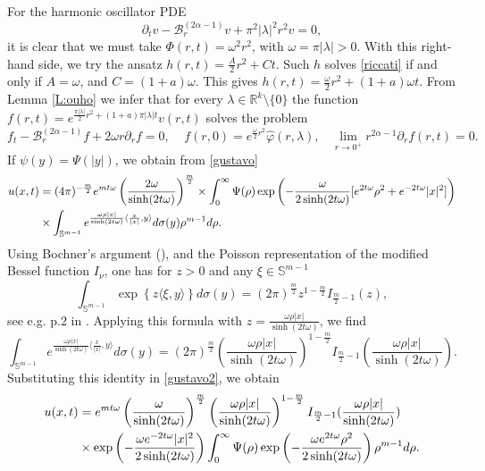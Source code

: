 \documentclass[11pt,a4paper]{amsart}
\def \R {\mathbb{R}}
\newcommand{\Barr}{\mathscr B_r^{(2\alpha-1)}}
\def \vf{\varphi}
\newcommand{\p}{\partial}
\newcommand{\la}{\lambda}
\numberwithin{equation}{section}
\newcommand{\sa}{\langle}
\newcommand{\da}{\rangle}
\numberwithin{equation}{section}
\begin{document}
For the harmonic oscillator PDE
\[
\p_t v - \Barr v + \pi^2|\la|^2 r^2 v = 0,
\]
it is clear that we must take $\Phi(r,t) =  \omega^2 r^2$, with $\omega = \pi |\la|>0$. With this right-hand side,  we try the ansatz $h(r,t) = \frac{A}{2} r^2 + C t$. Such $h$ solves \eqref{riccati} if and only if
$A = \omega$, and  $C = (1+a)\omega$. This gives $h(r,t) = \frac{\omega}{2} r^2 + (1+a)\omega t$. From Lemma \ref{L:ouho} we infer that for every $\la\in \R^k\setminus\{0\}$ the function $f(r,t) = e^{\frac{\pi |\la|}{2} r^2 + (1+a)\pi |\la| t} v(r,t)$ solves the problem
\begin{equation}\label{cpou}
f_t - \Barr f + 2 \omega r \p_r  f  = 0,\ \ \ \ \ f(r,0) = e^{\frac{\omega}{2} r^2} \hat \vf(r,\la),\ \ \ \ \underset{r\to 0^+}{\lim} r^{2\alpha-1} \p_r f(r,t) = 0.
\end{equation}
If $\psi(y) = \Psi(|y|)$, we obtain from \eqref{gustavo}
\begin{align}\label{gustavo2}
u(x,t) & = (4\pi)^{- \frac m2} e^{m t  \omega} \left(\frac{2 \omega}{\sinh(2t \omega)}\right)^{\frac m2}
\times \int_0^\infty \Psi(\rho) \exp\left(- \frac{\omega}{2 \sinh(2t\omega)} [e^{2t\omega} \rho^2 + e^{-2 t \omega} |x|^2]\right)
\\
& \times  \int_{\mathbb S^{m-1}}  e^{ \frac{\omega \rho |x|}{\sinh(2t\omega)}\sa \frac{x}{|x|},y\da} d\sigma(y) \rho^{m-1} d\rho.
\notag
\end{align}
Using Bochner's argument (\cite[Theor. 40 on p. 69]{BC}), and the Poisson  representation of the modified Bessel function $I_\nu$, one has for $z>0$ and any $\xi\in \mathbb S^{m-1}$
\[
\int_{\mathbb S^{m-1}} \exp \left\{z\sa\xi,y\da\right\} d\sigma(y) =  (2\pi)^{\frac m2} z^{1-\frac m2} I_{\frac m2 - 1}(z),
\]
see e.g. p.2 in \cite{Gcontmat}.
Applying this formula with $z = \frac{\omega \rho |x|}{\sinh(2t\omega)}$, we find
\[
\int_{\mathbb S^{m-1}}  e^{ \frac{\omega \rho |x|}{\sinh(2t\omega)}\sa \frac{x}{|x|},y\da} d\sigma(y) = 
(2\pi)^{\frac m2} \left(\frac{\omega \rho |x|}{\sinh(2t\omega)}\right)^{1-\frac m2} I_{\frac m2 - 1}(\frac{\omega \rho |x|}{\sinh(2t\omega)}).
\]
Substituting this identity in \eqref{gustavo2}, we obtain
\begin{align}\label{gus3}
u(x,t) & =  e^{m t  \omega} \left(\frac{\omega}{\sinh(2t \omega)}\right)^{\frac m2} \left(\frac{\omega\rho |x|}{\sinh(2t\omega)}\right)^{1-\frac m2} I_{\frac m2 - 1}(\frac{\omega \rho|x|}{\sinh(2t\omega)})
\\
& \times \exp\left(- \frac{\omega e^{-2 t \omega} |x|^2}{2 \sinh(2t\omega)}\right) \int_0^\infty \Psi(\rho) \exp\left(- \frac{\omega e^{2t\omega} \rho^2}{2 \sinh(2t\omega)}\right)
  \rho^{m-1} d\rho.
\notag
\end{align}
\end{document}
